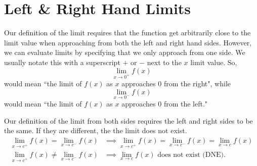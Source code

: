 \section{Left \& Right Hand Limits}
Our definition of the limit requires that the function get arbitrarily close to the limit value when approaching from both the left and right hand sides.
However, we can evaluate limits by specifying that we only approach from one side.
We usually notate this with a superscript $+$ or $-$ next to the $x$ limit value.
So,
\begin{equation*}
	\lim_{x \to 0^+}{f(x)}
\end{equation*}
would mean ``the limit of $f(x)$ as $x$ approaches $0$ from the right", while
\begin{equation*}
	\lim_{x \to 0^-}{f(x)}
\end{equation*}
would mean ``the limit of $f(x)$ as $x$ approaches $0$ from the left."


Our definition of the limit from both sides requires the left and right sides to be the same.
If they are different, the the limit does not exist.
\begin{align*}
	\lim_{x \to c^+}{f(x)} = \lim_{x \to c^-}{f(x)} &\implies \lim_{x \to c^+}{f(x)} = \lim_{x \to c^-}{f(x)} = \lim_{x \to c}{f(x)} \\
	\lim_{x \to c^+}{f(x)} \neq \lim_{x \to c^-}{f(x)} &\implies \lim_{x \to c}{f(x)} \text{ does not exist (DNE)}.
\end{align*}
